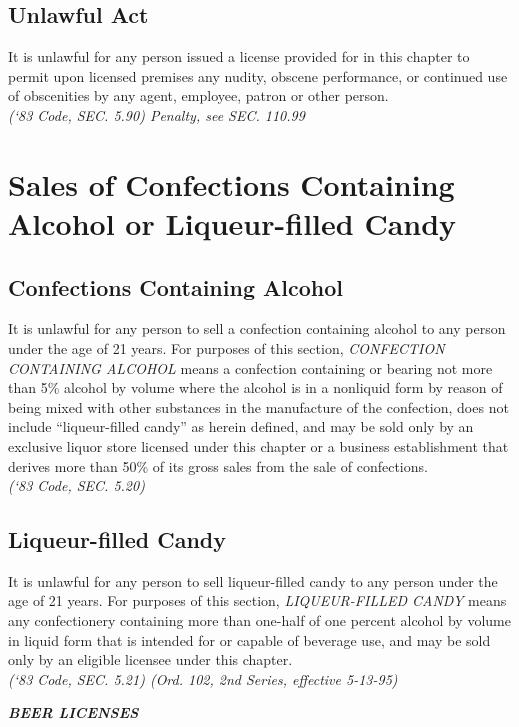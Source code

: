 \subsection{Unlawful Act}
It is unlawful for any person issued a license provided for in this chapter to permit upon licensed premises any nudity, obscene performance, or continued use of obscenities by any agent, employee, patron or other person.\\
\emph{(‘83 Code, SEC. 5.90)  Penalty, see SEC. 110.99}
\section{Sales of Confections Containing Alcohol or Liqueur-filled Candy}
\subsection{Confections Containing Alcohol}
It is unlawful for any person to sell a confection containing alcohol to any person under the age of 21 years.  For purposes of this section, \emph{CONFECTION CONTAINING ALCOHOL} means a confection containing or bearing not more than 5\% alcohol by volume where the alcohol is in a nonliquid form by reason of being mixed with other substances in the manufacture of the confection, does not include “liqueur-filled candy” as herein defined, and may be sold only by an exclusive liquor store licensed under this chapter or a business establishment that derives more than 50\% of its gross sales from the sale of confections.\\
\emph{(‘83 Code, SEC. 5.20)}
\subsection{Liqueur-filled Candy}
It is unlawful for any person to sell liqueur-filled candy to any person under the age of 21 years.  For purposes of this section, \emph{LIQUEUR-FILLED CANDY} means any confectionery containing more than one-half of one percent alcohol by volume in liquid form that is intended for or capable of beverage use, and may be sold only by an eligible licensee under this chapter.\\
\emph{(‘83 Code, SEC. 5.21)  (Ord. 102, 2nd Series, effective 5-13-95)}

\begin{center}
    \emph{\textbf{\LARGE{BEER LICENSES}}}
\end{center}

\setcounter{section}{59}
